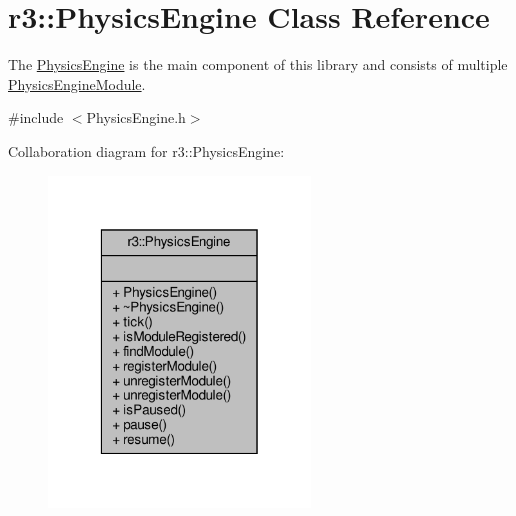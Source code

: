 \hypertarget{classr3_1_1_physics_engine}{}\section{r3\+:\+:Physics\+Engine Class Reference}
\label{classr3_1_1_physics_engine}


The \mbox{\hyperlink{classr3_1_1_physics_engine}{Physics\+Engine}} is the main component of this library and consists of multiple \mbox{\hyperlink{classr3_1_1_physics_engine_module}{Physics\+Engine\+Module}}.  




{\ttfamily \#include $<$Physics\+Engine.\+h$>$}



Collaboration diagram for r3\+:\+:Physics\+Engine\+:\nopagebreak
\begin{figure}[H]
\begin{center}
\leavevmode
\includegraphics[width=197pt]{classr3_1_1_physics_engine__coll__graph}
\end{center}
\end{figure}
